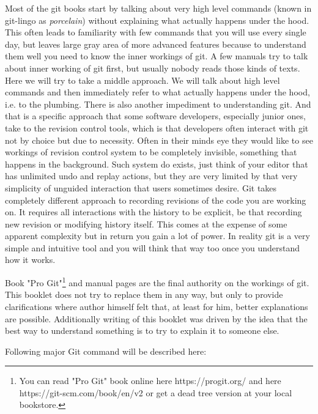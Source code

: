 \documentclass{article}
\theoremstyle{definition}
\begin{document}
        Most of the git books start by talking about very high level commands (known in git-lingo as {\em porcelain})
        without explaining what actually happens under the hood. This often leads to familiarity with few commands that you
        will use every single day, but leaves large gray area of more advanced features because to understand them well you
        need to know the inner workings of git. A few manuals try to talk about inner working of git first, but usually nobody
        reads those kinds of texts. Here we will try to take a middle approach. We will talk about high level commands and
        then immediately refer to what actually happens under the hood, i.e. to the plumbing. There is also another impediment
        to understanding git. And that is a specific approach that some software developers, especially junior ones, take to
        the revision control tools, which is that developers often interact with git not by choice but due to necessity.
        Often in their minds eye they would like to see workings of revision control system to be completely invisible,
        something that happens in the background. Such system do exists, just think of your editor that has unlimited undo
        and replay actions, but they are very limited by that very simplicity of unguided interaction that users sometimes
        desire. Git takes completely different approach to recording revisions of the code you are working on. It requires
        all interactions with the history to be explicit, be that recording new revision or modifying history itself.
        This comes at the expense of some apparent complexity but in return you gain a lot of power. In reality git is a
        very simple and intuitive tool and you will think that way too once you understand how it works.

        Book "Pro Git"\footnote{You can read "Pro Git" book online here https://progit.org/ and here
        https://git-scm.com/book/en/v2 or get a dead tree version at your local bookstore.} and manual pages are the final
        authority on the workings of git. This booklet does not try to replace them in any way, but only to provide
        clarifications where author himself felt that, at least for him, better explanations are possible. Additionally
        writing of this booklet was driven by the idea that the best way to understand something is to try to explain it to
        someone else.

        Following major Git command will be described here:
\end{document}
